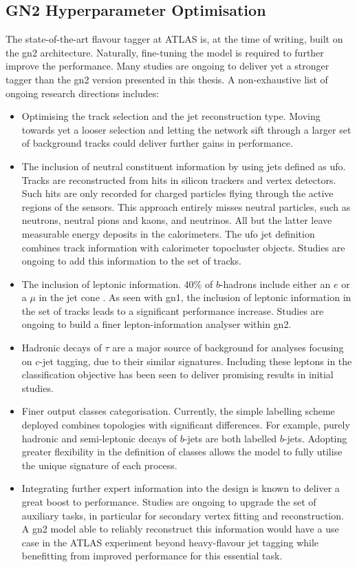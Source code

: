 \subsection{GN2 Hyperparameter Optimisation}\label{chap-GN2Opt}
The state-of-the-art flavour tagger at ATLAS is, at the time of writing, built on the \gls{gn2} architecture. Naturally, fine-tuning the model is required to further improve the performance. Many studies are ongoing to deliver yet a stronger tagger than the \gls{gn2} version presented in this thesis. A non-exhaustive list of ongoing research directions includes: 
\begin{itemize}
  \item Optimising the track selection and the jet reconstruction type. Moving towards yet a looser selection and letting the network sift through a larger set of background tracks could deliver further gains in performance.
  \item The inclusion of neutral constituent information by using jets defined as \gls{ufo}. Tracks are reconstructed from hits in silicon trackers and vertex detectors. Such hits are only recorded for charged particles flying through the active regions of the sensors. This approach entirely misses neutral particles, such as neutrons, neutral pions and kaons, and neutrinos. All but the latter leave measurable energy deposits in the calorimeters. The \gls{ufo} jet definition combines track information with calorimeter topocluster objects. Studies are ongoing to add this information to the set of tracks. 
  \item The inclusion of leptonic information. 40\% of $b$-hadrons include either an $e$ or a $\mu$ in the jet cone \cite{Tanabashi:2018oca}. As seen with \gls{gn1}, the inclusion of leptonic information in the set of tracks leads to a significant performance increase. Studies are ongoing to build a finer lepton-information analyser within \gls{gn2}.
  \item Hadronic decays of $\tau$ are a major source of background for analyses focusing on $c$-jet tagging, due to their similar signatures. Including these leptons in the classification objective has been seen to deliver promising results in initial studies. 
  \item Finer output classes categorisation. Currently, the simple labelling scheme deployed combines topologies with significant differences. For example, purely hadronic and semi-leptonic decays of $b$-jets are both labelled $b$-jets. Adopting greater flexibility in the definition of classes allows the model to fully utilise the unique signature of each process. 
  \item Integrating further expert information into the design is known to deliver a great boost to performance. Studies are ongoing to upgrade the set of auxiliary tasks, in particular for secondary vertex fitting and reconstruction. A \gls{gn2} model able to reliably reconstruct this information would have a use case in the ATLAS experiment beyond heavy-flavour jet tagging while benefitting from improved performance for this essential task.  
\end{itemize}

